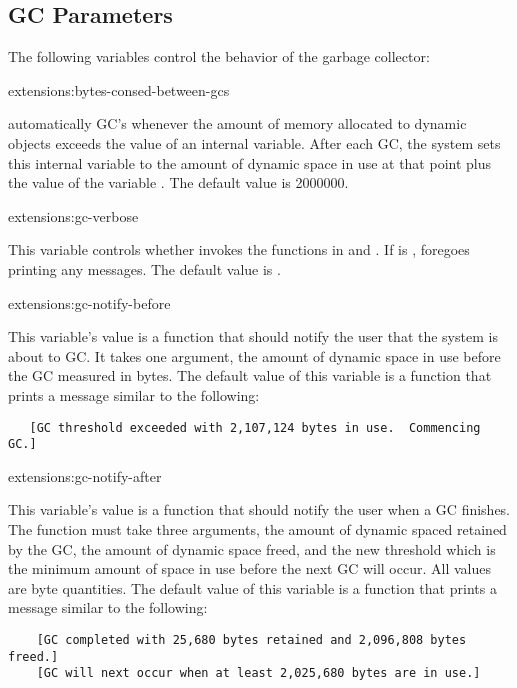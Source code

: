 \subsection{GC Parameters}

The following variables control the behavior of the garbage collector:

\begin{defvar}{extensions:}{bytes-consed-between-gcs}
  
  \cmucl{} automatically GC's whenever the amount of memory
  allocated to dynamic objects exceeds the value of an internal
  variable.  After each GC, the system sets this internal variable to
  the amount of dynamic space in use at that point plus the value of
  the variable .  The default
  value is 2000000.
\end{defvar}

\begin{defvar}{extensions:}{gc-verbose}
  
  This variable controls whether  invokes the functions
  in  and
  .  If  is \nil,
   foregoes printing any messages.  The default value is
  .
\end{defvar}

\begin{defvar}{extensions:}{gc-notify-before}
  
  This variable's value is a function that should notify the user that
  the system is about to GC.  It takes one argument, the amount of
  dynamic space in use before the GC measured in bytes.  The default
  value of this variable is a function that prints a message similar
  to the following:
\begin{verbatim}
   [GC threshold exceeded with 2,107,124 bytes in use.  Commencing GC.]
\end{verbatim}
\end{defvar}

\begin{defvar}{extensions:}{gc-notify-after}
  
  This variable's value is a function that should notify the user when
  a GC finishes.  The function must take three arguments, the amount
  of dynamic spaced retained by the GC, the amount of dynamic space
  freed, and the new threshold which is the minimum amount of space in
  use before the next GC will occur.  All values are byte quantities.
  The default value of this variable is a function that prints a
  message similar to the following:
  \begin{verbatim}
    [GC completed with 25,680 bytes retained and 2,096,808 bytes freed.]
    [GC will next occur when at least 2,025,680 bytes are in use.]
  \end{verbatim}
\end{defvar}


